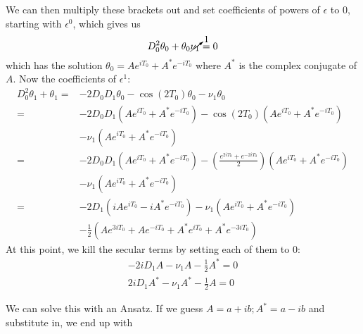\documentclass[12pt]{article}
\begin{document}
\begin{enumerate}
\begin{enumerate}
            We can then multiply these brackets out and set coefficients of powers of $\epsilon$ to 0, 
            starting with $\epsilon^0$, which gives us
            \begin{equation*}
                D_0^2\theta_0 + \theta_0\cancelto{1}{\nu_1} = 0
            \end{equation*}
            which has the solution $\theta_0 = Ae^{iT_0}+A^*e^{-iT_0}$ where $A^*$ is the 
            complex conjugate of $A$. Now the coefficients of $\epsilon^1$:
            \begin{equation*}
                \begin{split}    
                    D_0^2 \theta_1 +\theta_1 =& -2D_0D_1\theta_0-\cos(2T_0)\theta_0-\nu_1\theta_0 \\
                    =& -2D_0D_1(Ae^{iT_0}+A^*e^{-iT_0})-\cos(2T_0)(Ae^{iT_0}+A^*e^{-iT_0}) \\
                    &-\nu_1(Ae^{iT_0}+A^*e^{-iT_0}) \\
                    =& -2D_0D_1(Ae^{iT_0}+A^*e^{-iT_0})-\left(\frac{e^{2iT_0}+e^{-2iT_0}}{2}\right)(Ae^{iT_0}+A^*e^{-iT_0}) \\
                    &-\nu_1(Ae^{iT_0}+A^*e^{-iT_0}) \\
                    =& -2D_1(iAe^{iT_0}-iA^*e^{-iT_0})-\nu_1(Ae^{iT_0}+A^*e^{-iT_0}) \\
                    &-\frac{1}{2}(Ae^{3iT_0}+Ae^{-iT_0}+A^*e^{iT_0}+A^*e^{-3iT_0})
                \end{split}
            \end{equation*}
            At this point, we kill the secular terms by setting each of them to 0:
            \begin{equation}
                \begin{split}
                    -2iD_1A-\nu_1A-\frac{1}{2}A^* = 0 \\
                    2iD_1A^*-\nu_1A^*-\frac{1}{2}A = 0
                \end{split}
                \label{eqn:SecularA}
            \end{equation}

            We can solve this with an Ansatz. If we guess $A=a+ib; A^*=a-ib$ and substitute in, 
            we end up with 

        \end{enumerate}
    \end{enumerate}
\end{document}
